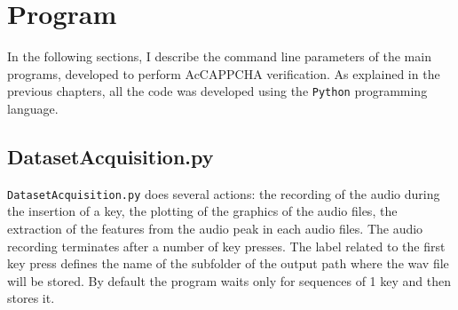 \chapter{Program}\label{appendix:Program}
In the following sections, I describe the command line parameters of the main programs, developed to perform AcCAPPCHA verification. As explained in the previous chapters, all the code was developed using the \texttt{Python} programming language.

\section{DatasetAcquisition.py}
\texttt{DatasetAcquisition.py} does several actions: the recording of the audio during the insertion of a key, the plotting of the graphics of the audio files, the extraction of the features from the audio peak in each audio files. The audio recording terminates after a number of key presses. The label related to the first key press defines the name of the subfolder of the output path where the wav file will be stored. By default the program waits only for sequences of 1 key and then stores it.

